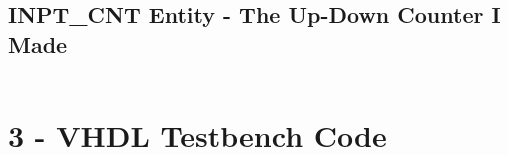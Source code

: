\documentclass[11pt]{report}
\begin{document}
\subsection*{INPT\_CNT Entity - The Up-Down Counter I Made}
\inputminted{vhdl}{../../../DE_Project_T3/DE_Project_T3.srcs/sources_1/new/Param_Counter_UpDown.vhd}



\section*{3 - VHDL Testbench Code}
\inputminted{vhdl}{../../../DE_Project_T3/DE_Project_T3.srcs/sim_1/imports/DigEng_Proj_T3_model/TOP_LEVEL_tb.vhd}
\end{document}

